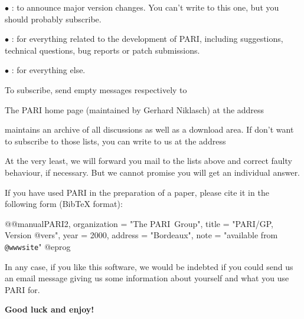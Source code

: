 $\bullet$ : to announce major version changes.
You can't write to this one, but you should probably subscribe.

$\bullet$ : for everything related to the development
of PARI, including suggestions, technical questions, bug reports or patch
submissions.

 $\bullet$ : for everything else.

\noindent To subscribe, send empty messages respectively to

\centerline{}

\centerline{}

\centerline{}

\noindent The PARI home page (maintained by Gerhard Niklasch) at the address

\centerline{\wwwsite}

\noindent maintains an archive of all discussions as well as a download area.
If don't want to subscribe to those lists, you can write to us at the address

\centerline{}

\noindent At the very least, we will forward you mail to the lists above and
correct faulty behaviour, if necessary. But we cannot promise you will get an
individual answer.

If you have used PARI in the preparation of a paper, please cite it in the
following form (BibTeX format):

\def\@{@}
\bprog
@@manual{PARI2,
    organization = "{The PARI~Group}",
    title        = "{PARI/GP, Version @vers}",
    year         = 2000,
    address      = "Bordeaux",
    note         = "available from {\tt @wwwsite}"
}
@eprog
\smallskip

\noindent In any case, if you like this software, we would be indebted if you
could send us an email message giving us some information about yourself and
what you use PARI for.

\medskip
{\bf Good luck and enjoy!}
\vfill\eject
